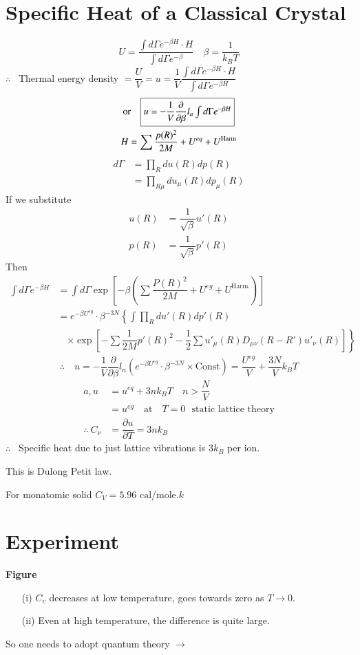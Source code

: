 \section*{Specific Heat of a Classical Crystal}
$$
U=\dfrac{\int d\Gamma e^{-\beta H}\cdot H}{\int d\Gamma e^{-\beta}}\quad \beta=\dfrac{1}{k_{B}T}
$$
$\therefore$ \ Thermal energy density $=\dfrac{U}{V}=u=\dfrac{1}{V}\dfrac{\int d\Gamma e^{-\beta H}\cdot H}{\int d\Gamma e^{-\beta H}}$
\begin{gather*}
\text{or}\quad \fbox{$u=-\dfrac{1}{V}\dfrac{\partial}{\partial\beta} l_{a}\int d\Gamma e^{-\beta H}$}\\
H= \sum \dfrac{p(R)^{2}}{2M}+U^{eq}+U^{\text{Harm}}
\end{gather*}
\begin{align*}
d\Gamma &= \prod\limits_{R}du(R)dp(R)\\
&= \prod\limits_{R\mu}du_{\mu}(R)dp_{\mu}(R)
\end{align*}
If we substitute
\begin{align*}
u(R) &= \dfrac{1}{\sqrt{\beta}}u'(R)\\
p(R) &= \dfrac{1}{\sqrt{\beta}}p'(R)
\end{align*}
Then
\begin{align*}
\int d\Gamma e^{-\beta H} &= \int d\Gamma \exp \left[-\beta\left(\sum \dfrac{P(R)^{2}}{2M}+U^{eg}+U^{\text{Harm.}}\right)\right]\\
&= e^{-\beta U^{eg}}\cdot \beta^{-3N}\left\{\int\prod\limits_{R}du'(R)dp'(R)\right.\\
&\quad \left.\times \exp \left[-\sum \dfrac{1}{2M}p'(R)^{2}-\dfrac{1}{2}\sum u'_{\mu}(R)D_{\mu\nu}(R-R')u'_{\nu}(R)\right]\right\}
\end{align*}
$$
\therefore\quad u=-\dfrac{1}{V}\dfrac{\partial}{\partial\beta}l_{n}\left(e^{-\beta U^{eg}}\cdot \beta^{-3N}\times \text{Const}\right)=\dfrac{U^{eg}}{V}+\dfrac{3N}{V}k_{B}T
$$
\begin{align*}
a, u &= u^{eq}+3nk_{B}T\quad n>\dfrac{N}{V}\\
&= u^{eg}\quad\text{at}\quad T=0\text{~ static lattice theory}\\
\therefore \ C_{\nu} &= \dfrac{\partial u}{\partial T}=3nk_{B}
\end{align*}
$\therefore$ \ Specific heat due to just lattice vibrations is $3k_{B}$ per ion.

This is Dulong Petit law.

For monatomic solid $C_{V}=5.96 \text{ cal/mole.}k$

\section*{Experiment}
\begin{center}
{\bf Figure}
\end{center}
\begin{itemize}
\item[(i)] $C_{v}$ decreases at low temperature, goes towards zero as $T\to 0$.

\item[(ii)] Even at high temperature, the difference is quite large.
\end{itemize}
So one needs to adopt quantum theory $\to$

